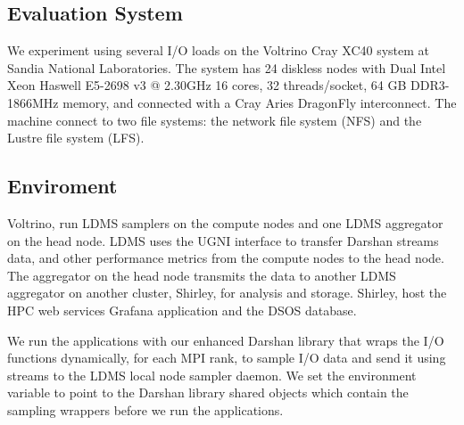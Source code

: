 \subsection{Evaluation System}
We experiment using several I/O loads on the Voltrino Cray XC40 system at Sandia National Laboratories. The system has 24  diskless nodes with Dual Intel Xeon Haswell E5-2698 v3 @ 2.30GHz 16 cores, 32 threads/socket, 64 GB DDR3-1866MHz memory, and connected with a Cray Aries DragonFly interconnect. The machine connect to two file systems: the network file system (NFS) and the Lustre file system (LFS).

\subsection{Enviroment}
Voltrino, run LDMS samplers on the compute nodes and one LDMS aggregator on the head node. LDMS uses the UGNI interface to transfer Darshan streams data, and other performance metrics from the compute nodes to the head node. The aggregator on the head node transmits the data to another LDMS aggregator on another cluster, Shirley, for analysis and storage. Shirley, host the HPC web services Grafana application and the DSOS database. 

We run the applications with our enhanced Darshan library that wraps the I/O functions dynamically, for each MPI rank, to sample I/O data and send it using streams to the LDMS local node sampler daemon. We set the  environment variable to point to the Darshan library shared objects which contain the sampling wrappers before we run the applications.



		
%


